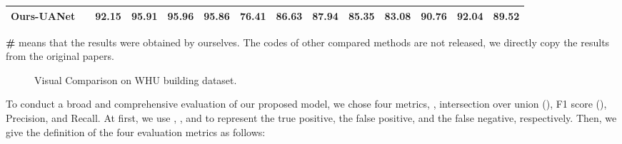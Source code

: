 \documentclass[lettersize,journal]{IEEEtran}
\begin{document}
\begin{table*}[]
\begin{tabular}{c|c|cccc|cccc|cccc}
\textbf{Ours-UANet} &  &
\color{red}\textbf{92.15} &{\color{red}\textbf{95.91}} &{\color{red}\textbf{95.96}} &\color{red}\textbf{95.86}

& \color{red}\textbf{{76.41}} &\color{red}\textbf{{86.63}} &\color{red}\textbf{87.94} &\color{red}\textbf{{85.35}}

& {\color{red}\textbf{83.08}} &{\color{red}\textbf{90.76}} &{\color{red}\textbf{92.04}} &{\color{red}\textbf{89.52}}
\\ \hline
\end{tabular}

{\textbf{\#} means that the results were obtained by ourselves. The codes of other compared methods are not released, we directly copy the results from the original papers. }
\vspace{-1.0em}
\end{table*}


\begin{figure*}
\centering
{}
\hfil
{}
\hfil
{}
\hfil
{}
\hfil
{}
\hfil
{}
\hfil
{}
\hfil
\caption{Visual Comparison on WHU building dataset.}
\label{fig_tp_whu}
\vspace{-0.5em}
\end{figure*}

To conduct a broad and comprehensive evaluation of our proposed model, we chose four metrics, , intersection over union (), F1 score (), Precision, and Recall. At first, we use , , and  to represent the true positive, the false positive, and the false negative, respectively. Then, we give the definition of the four evaluation metrics as follows:


\vspace{-1.0em}

\vspace{-1.0em}
\end{document}

